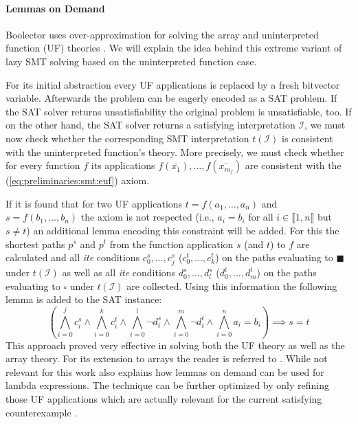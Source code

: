 \paragraph{Lemmas on Demand}
Boolector uses over-approximation for solving the array \cite{p6-brummayer} and uninterpreted function (UF) theories \cite{PreinerNiemetzBiere-DIFTS13}. We will explain the idea behind this extreme variant of lazy SMT solving based on the uninterpreted function case.
\par
For its initial abstraction every UF applications is replaced by a fresh bitvector variable. Afterwards the problem can be eagerly encoded as a SAT problem. If the SAT solver returns unsatisfiability the original problem is unsatisfiable, too. If on the other hand, the SAT solver returns a satisfying interpretation $\mathcal{I}$, we must now check whether the corresponding SMT interpretation $t\left(\mathcal{I}\right)$ is consistent with the uninterpreted function's theory. More precisely, we must check whether for every function $f$ its applications $f\left(\overline{x_1}\right),\dots,f\left(\overline{x_{m_{f}}}\right)$ are consistent with the (\ref{eq:preliminaries:smt:euf}) axiom.
\par
If it is found that for two UF applications $t=f\left(a_1,\dots,a_n\right)$ and $s=f\left(b_1,\dots,b_n\right)$
the axiom is not respected (i.e., $a_i=b_i$ for all $i\in\llbracket1,n\rrbracket$ but $s\neq t$) an additional lemma encoding this constraint will be added. For this the shortest paths $p^s$ and $p^t$ from the function application $s$ (and $t$) to $f$ are calculated and all \textit{ite} conditions $c_0^s,\dots,c_j^s$ ($c_0^t,\dots,c_k^t$) on the paths evaluating to $\blacksquare$ under $t\left(\mathcal{I}\right)$ as well as all \textit{ite} conditions $d_0^s,\dots,d_l^s$ ($d_0^t,\dots,d_m^t$) on the paths evaluating to $\square$ under $t\left(\mathcal{I}\right)$ are collected. Using this information the following lemma is added to the SAT instance:
\[
\left(\bigwedge\limits_{i=0}^{j}c_i^s \land \bigwedge\limits_{i=0}^{k}c_i^t \land \bigwedge\limits_{i=0}^{l} \neg d_i^s \land \bigwedge\limits_{i=0}^{m} \neg d_i^t \land \bigwedge\limits_{i=0}^{n} a_i=b_i \right) \implies s=t
\]
This approach proved very effective in solving both the UF theory as well as the array theory.
For its extension to arrays the reader is referred to \cite{p6-brummayer}.
While not relevant for this work \cite{PreinerNiemetzBiere-DIFTS13} also explains how lemmas on demand can be used for lambda expressions.
The technique can be further optimized by only refining those UF applications which are actually relevant for the current satisfying counterexample \cite{NiemetzPreinerBiere-FMCAD14}.

